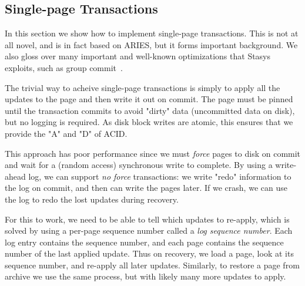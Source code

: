 \documentclass[letterpaper,twocolumn,10pt]{article}
\newcommand{\yad}{Stasys\xspace}
\newcommand{\eat}[1]{}
\begin{document}
\eat{
\yad uses write-ahead-logging to support the
four properties of transactional storage: Atomicity, Consistency,
Isolation and Durability.  Like existing transactional storage sytems,
\yad allows applications to disable or choose different variants of each
property.

However, \yad takes customization of transactional semantics one step
further, allowing applications to add support for transactional
semantics that we have not anticipated.  We do not believe that
we can anticipate every possible variation of write ahead logging.  
However, we
have observed that most changes that we are interested in making
involve a few common underlying primitives.  

As we have
implemented new extensions, we have located portions of the system
that are prone to change, and have extended the API accordingly.  Our
goal is to allow applications to implement their own modules to
replace our implementations of each of the major write ahead logging
components.
}


\subsection{Single-page Transactions}

In this section we show how to implement single-page transactions.
This is not at all novel, and is in fact based on ARIES, but it forms
important background.  We also gloss over many important and
well-known optimizations that \yad exploits, such as group
commit~\cite{group-commit}.

The trivial way to acheive single-page transactions is simply to apply
all the updates to the page and then write it out on commit. The page
must be pinned until the transaction commits to avoid "dirty" data
(uncommitted data on disk), but no logging is required.  As disk
block writes are atomic, this ensures that we provide the "A" and "D"
of ACID.

This approach has poor performance since we must {\em force} pages to disk
on commit and wait for a (random access) synchronous write to
complete. By using a write-ahead log, we can support {\em no force}
transactions: we write "redo" information to the log on commit, and
then can write the pages later. If we crash, we can use the log to
redo the lost updates during recovery.

For this to work, we need to be able to tell which updates to
re-apply, which is solved by using a per-page sequence number called a
{\em log sequence number}. Each log entry contains the sequence
number, and each page contains the sequence number of the last applied
update.  Thus on recovery, we load a page, look at its sequence
number, and re-apply all later updates.  Similarly, to restore a page
from archive we use the same process, but with likely many more
updates to apply.
\end{document}
